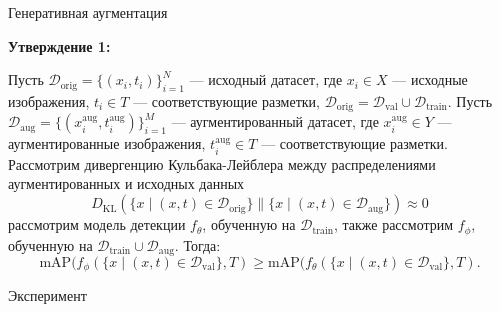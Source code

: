 \documentclass{beamer}
\begin{document}
\begin{frame}{Генеративная аугментация}

\textbf{Утверждение 1:}\par

Пусть \( \mathcal{D}_{\text{orig}} = \{(x_i, t_i)\}_{i=1}^{N} \) — исходный датасет, где \( x_i \in X \) — исходные изображения, \( t_i \in T \) — соответствующие разметки, $\mathcal{D}_{\text{orig}} = \mathcal{D}_{\text{val}} \cup \mathcal{D}_{\text{train}}$. Пусть \( \mathcal{D}_{\text{aug}} = \{(x_i^{\text{aug}}, t_i^{\text{aug}})\}_{i=1}^{M} \) — аугментированный датасет, где \( x_i^{\text{aug}} \in Y \) — аугментированные изображения, \( t_i^{\text{aug}} \in T \) — соответствующие разметки. Рассмотрим дивергенцию Кульбака-Лейблера между распределениями аугментированных и исходных данных \[ D_{\mathrm{KL}}(\{ x \mid (x, t) \in  \mathcal{D}_{\text{orig}}\} \parallel \{ x \mid (x, t) \in  \mathcal{D}_{\text{aug}}\}) \approx 0 \] рассмотрим модель детекции $f_{\theta}$, обученную на $\mathcal{D}_{\text{train}}$, также рассмотрим $f_{\phi}$, обученную на $\mathcal{D}_{\text{train}} \cup \mathcal{D}_{\text{aug}}$. Тогда:
\[
{\text{mAP}}(f_{\phi}(\{ x \mid (x, t) \in  \mathcal{D}_{\text{val}}\}, T) \geq {\text{mAP}}(f_{\theta}(\{ x \mid (x, t) \in  \mathcal{D}_{\text{val}}\}, T).
\]

\end{frame}




\begin{frame}{Эксперимент}

\begin{table}[ht]
\label{tab:map_comparison}
\centering
{}
\caption{Сравнение показателей mAP для модели детекции YOLO, обученной в течение 500 эпох, с порогом фильтрации аугментаций 0.2.}
\end{table}


\end{frame}
\end{document}
